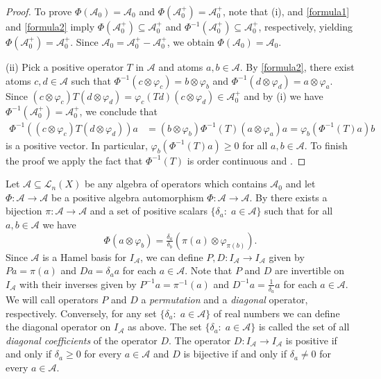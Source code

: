 \documentclass[12pt,reqno]{amsart}
\theoremstyle{plain}
\theoremstyle{definition}
\begin{document}
\begin{proof}
To prove $\Phi(\mathscr A_0)=\mathscr A_0$ and $\Phi(\mathscr A_0^+)=\mathscr A_0^+$, note that (i), and \eqref{formula1} and \eqref{formula2} imply
$\Phi(\mathscr A_0^+)\subseteq  \mathscr A_0^+$ and $\Phi^{-1}(\mathscr A_0^+)\subseteq \mathscr A_0^+$, respectively, yielding $\Phi(\mathscr A_0^+)=\mathscr A_0^+$. Since $\mathscr A_0=\mathscr A_0^+-\mathscr A_0^+$, we obtain $\Phi(\mathscr A_0)=\mathscr A_0$.

(ii) Pick a positive operator $T$ in $\mathscr A$ and atoms $a,b\in \mathcal A$. By \eqref{formula2}, there exist atoms $c,d\in \mathcal A$ such that
$\Phi^{-1}(c\otimes \varphi_c)=b\otimes \varphi_b$ and $\Phi^{-1}(d\otimes \varphi_d)=a\otimes \varphi_a$.
Since $(c\otimes \varphi_c)T(d\otimes \varphi_d)=\varphi_c(Td)(c\otimes \varphi_d) \in \mathscr A_0^+$ and by (i) we have $\Phi^{-1}(\mathscr A_0^+)=\mathscr A_0^+$, we conclude that
\begin{align*}
\Phi^{-1}((c\otimes \varphi_c)T(d\otimes \varphi_d))a&=(b\otimes \varphi_b)\Phi^{-1}(T)(a\otimes \varphi_a)a=\varphi_b(\Phi^{-1}(T)a)b
\end{align*}
is a positive vector. In particular, $\varphi_b(\Phi^{-1}(T)a)\geq 0$ for all $a,b\in \mathcal A$. To finish the proof we apply the fact that $\Phi^{-1}(T)$ is order continuous and . 
\end{proof}



Let $\mathscr A\subseteq \mathscr L_n(X)$ be any algebra of operators which contains $\mathscr A_0$ and let $\Phi\colon \mathscr A\to \mathscr A$ be a positive algebra automorphism $\Phi\colon \mathscr A\to \mathscr A$. By  there exists a
bijection $\pi\colon\mathscr A\to\mathscr A$ and a set of positive scalars $\{\delta_a:\; a\in\mathcal A\}$ such that
for all $a,b\in\mathcal A$ we have
$$\Phi(a\otimes\varphi_b)=\tfrac{\delta_a}{\delta_b} \left(\pi(a)\otimes\varphi_{\pi(b)}\right).$$
Since $\mathcal A$ is a Hamel basis for $I_{\mathcal A}$, we can define $P, D\colon I_{\mathcal A}\to I_{\mathcal A}$ given by
$Pa=\pi(a)$ and $Da=\delta_a a$ for each $a\in \mathcal A$. Note that  $P$ and $D$ are invertible  on $I_{\mathcal A}$ with their inverses given by
$P^{-1}a=\pi^{-1}(a)$ and  $D^{-1}a=\tfrac{1}{\delta_a}a$ for each $a\in \mathcal A$. We will call operators $P$ and $D$ a \emph{permutation} and a \emph{diagonal} operator, respectively. Conversely, for any set $\{\delta_a:\; a\in \mathcal A\}$ of real numbers  we can define the diagonal operator on $I_{\mathcal A}$ as above. The set $\{\delta_a:\; a\in \mathcal A\}$ is called the set of all \emph{diagonal coefficients} of the operator $D$.  The operator $D\colon I_{\mathcal A}\to I_{\mathcal A}$ is positive if and only if $\delta_a\geq 0$ for every $a\in \mathcal A$ and $D$ is bijective if and only if $\delta_a\neq 0$ for every $a\in \mathcal A$. 
\end{document}
